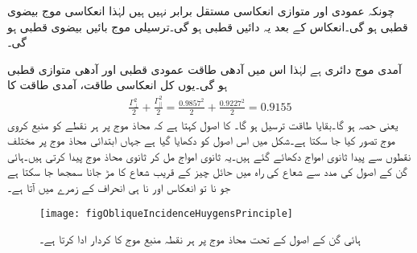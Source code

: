 چونکہ عمودی اور متوازی انعکاسی مستقل برابر نہیں ہیں لہٰذا انعکاسی موج بیضوی قطبی ہو گی۔انعکاس کے بعد یہ دائیں قطبی ہو گی۔ترسیلی موج بائیں بیضوی قطبی ہو گی۔

آمدی موج دائری ہے لہٰذا اس میں آدھی طاقت عمودی قطبی اور آدھی متوازی قطبی ہو گی۔یوں کل انعکاسی طاقت، آمدی طاقت کا
\begin{align*}
\frac{\Gamma_{\perp}^2}{2}+\frac{\Gamma_{\parallel}^2}{2}=\frac{0.9857^2}{2}+\frac{0.9227^2}{2}=0.9155
\end{align*}
یعنی  حصہ ہو گا۔بقایا  طاقت ترسیل ہو گا۔
 کا اصول کہتا ہے کہ محاذ موج پر ہر نقطے کو منبع کروی موج تصور کیا جا سکتا ہے۔شکل  میں اس اصول کو دکھایا گیا ہے جہاں ابتدائی محاذ موج پر مختلف نقطوں سے پیدا ثانوی امواج دکھائے گئے ہیں۔یہ ثانوی امواج مل کر ثانوی محاذ موج پیدا کرتی ہیں۔ہائی گن کے اصول کی مدد سے شعاع کی راہ میں حائل چیز کے قریب شعاع کا مڑ جانا سمجھا جا سکتا ہے جو نا تو انعکاس اور نا ہی انحراف کے زمرے میں آتا ہے۔   

\begin{figure}
\centering
\texttt{[image: figObliqueIncidenceHuygensPrinciple]}
\caption{ہائی گن کے اصول کے تحت محاذ موج پر ہر نقطہ منبع موج کا کردار ادا کرتا ہے۔}
\label{شکل_ترچھی_ہائی_گن_اصول}
\end{figure}

